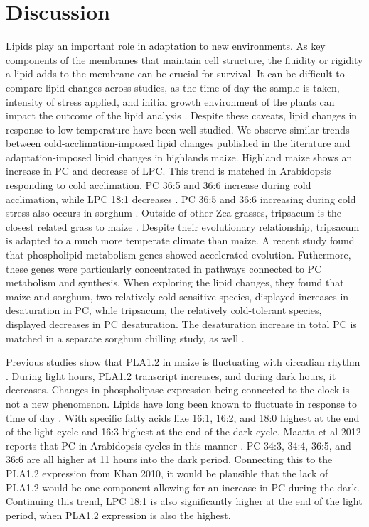\documentclass[9pt,twocolumn,twoside,lineno]{gsajnl}
\begin{document}
\section{Discussion}
\label{sec:discusion}
Lipids play an important role in adaptation to new environments. As key components of the membranes that maintain cell structure, the fluidity or rigidity a lipid adds to the membrane can be crucial for survival. It can be difficult to compare lipid changes across studies, as the time of day the sample is taken, intensity of stress applied, and initial growth environment of the plants can impact the outcome of the lipid analysis \cite{Kenchanmane_Raju2018-nz}. Despite these caveats, lipid changes in response to low temperature have been well studied. We observe similar trends between cold-acclimation-imposed lipid changes published in the literature and adaptation-imposed lipid changes in highlands maize. Highland maize shows an increase in PC and decrease of LPC. This trend is matched in Arabidopsis responding to cold acclimation. PC 36:5 and 36:6 increase during cold acclimation, while LPC 18:1 decreases \cite{Welti2002-uk}. PC 36:5 and 36:6 increasing during cold stress also occurs in sorghum \cite{Marla2017-ph}. 
Outside of other Zea grasses, tripsacum is the closest related grass to maize \cite{Yang2013-lg}. Despite their evolutionary relationship, tripsacum is adapted to a much more temperate climate than maize. A recent study found that phospholipid metabolism genes showed accelerated evolution\cite{Yang2013-lg}. Futhermore, these genes were particularly concentrated in pathways connected to PC metabolism and synthesis. When exploring the lipid changes, they found that maize and sorghum, two relatively cold-sensitive species, displayed increases in desaturation in PC, while tripsacum, the relatively cold-tolerant species, displayed decreases in PC desaturation. The desaturation increase in total PC is matched in a separate sorghum chilling study, as well \cite{Marla2017-ph}. 

Previous studies show that PLA1.2 in maize is fluctuating with circadian rhythm \cite{Khan2010-iv}. During light hours, PLA1.2 transcript increases, and during dark hours, it decreases. Changes in phospholipase expression being connected to the clock is not a new phenomenon. Lipids have long been known to fluctuate in response to time of day \cite{Browse1981-vt, Ekman2007-xe}. With specific fatty acids like 16:1, 16:2, and 18:0 highest at the end of the light cycle and 16:3 highest at the end of the dark cycle. Maatta et al 2012 reports that PC in Arabidopsis cycles in this manner \cite{Maatta2012-ip}. PC 34:3, 34:4, 36:5, and 36:6 are all higher at 11 hours into the dark period. Connecting this to the PLA1.2 expression from Khan 2010, it would be plausible that the lack of PLA1.2 would be one component allowing for an increase in PC during the dark. Continuing this trend, LPC 18:1 is also significantly higher at the end of the light period, when PLA1.2 expression is also the highest. 
\end{document}
